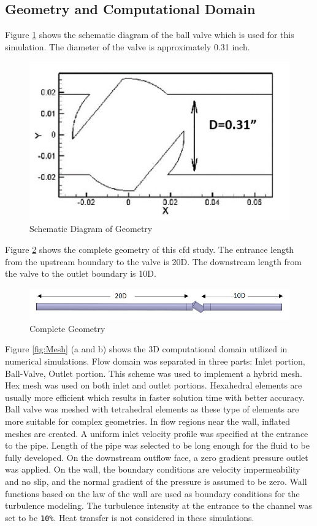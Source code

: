 \documentclass[]{article}
\begin{document}
\subsection{Geometry and Computational Domain}
Figure \ref{fig:geometry} shows the schematic diagram of the ball valve which is used for this simulation.  The diameter of the valve is approximately 0.31 inch. 
\begin{figure}[h]
	\centering
	\includegraphics[width=0.7\linewidth]{Photos/Geometry}
	\caption{Schematic Diagram of Geometry}
	\label{fig:geometry}
\end{figure}

Figure \ref{fig:entiregeometry} shows the complete geometry of this cfd study. The entrance length from the upstream boundary to the valve is 20D. The downstream length from the valve to the outlet boundary is 10D.
\begin{figure}
	\centering
	\includegraphics[width=0.7\linewidth]{Photos/Entire_Geometry}
	\caption{Complete Geometry}
	\label{fig:entiregeometry}
\end{figure}
Figure \ref{fig:Mesh} (a and b) shows the 3D computational domain utilized in numerical simulations. Flow domain was separated in three parts: Inlet portion, Ball-Valve, Outlet portion. This scheme was used to implement a hybrid mesh. Hex mesh was used on both inlet and outlet portions. Hexahedral elements are usually more efficient which results in faster solution time with better accuracy. Ball valve was meshed with tetrahedral elements as these type of elements are more suitable for complex geometries. In flow regions near the wall, inflated meshes are created. 
A uniform inlet velocity profile was specified at the entrance to the pipe. Length of the pipe was selected to be long enough for the fluid to be fully developed. On the downstream outflow face, a zero gradient pressure outlet was applied. On the wall, the boundary conditions are velocity impermeability and no slip, and the normal gradient of the pressure is assumed to be zero. Wall functions based on the law of the wall are used as boundary conditions for the turbulence modeling. The turbulence intensity at the entrance to the channel was set to be \verb|10%|. Heat transfer is not considered in these simulations.
\end{document}
